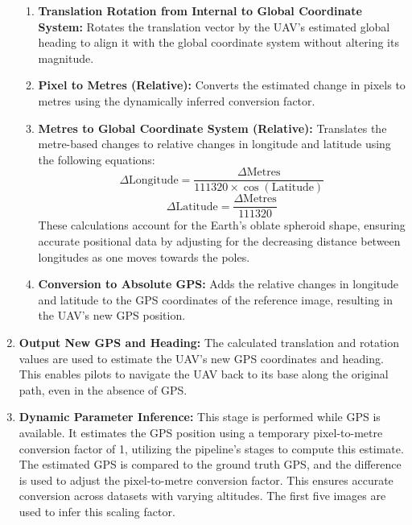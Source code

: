 \begin{enumerate}
\begin{enumerate}
        \item \textbf{Translation Rotation from Internal to Global Coordinate System:}  
        Rotates the translation vector by the UAV's estimated global heading to align it with the global coordinate system without altering its magnitude.
        
        \item \textbf{Pixel to Metres (Relative):}  
        Converts the estimated change in pixels to metres using the dynamically inferred conversion factor. 
        
        \item \textbf{Metres to Global Coordinate System (Relative):}  
        Translates the metre-based changes to relative changes in longitude and latitude using the following equations:
        \begin{equation}
            \Delta \text{Longitude} = \frac{\Delta \text{Metres}}{111320 \times \cos(\text{Latitude})}
        \end{equation}
        \begin{equation}
            \Delta \text{Latitude} = \frac{\Delta \text{Metres}}{111320}
        \end{equation}
        These calculations account for the Earth's oblate spheroid shape, ensuring accurate positional data by adjusting for the decreasing distance between longitudes as one moves towards the poles.
        
        \item \textbf{Conversion to Absolute GPS:}  
        Adds the relative changes in longitude and latitude to the GPS coordinates of the reference image, resulting in the UAV's new GPS position.
    \end{enumerate}

    \item \textbf{Output New GPS and Heading:}  
    The calculated translation and rotation values are used to estimate the UAV's new GPS coordinates and heading. This enables pilots to navigate the UAV back to its base along the original path, even in the absence of GPS.

    \item \textbf{Dynamic Parameter Inference:}  
    This stage is performed while GPS is available. It estimates the GPS position using a temporary pixel-to-metre conversion factor of 1, utilizing the pipeline's stages to compute this estimate. The estimated GPS is compared to the ground truth GPS, and the difference is used to adjust the pixel-to-metre conversion factor. This ensures accurate conversion across datasets with varying altitudes. The first five images are used to infer this scaling factor.


\end{enumerate}



